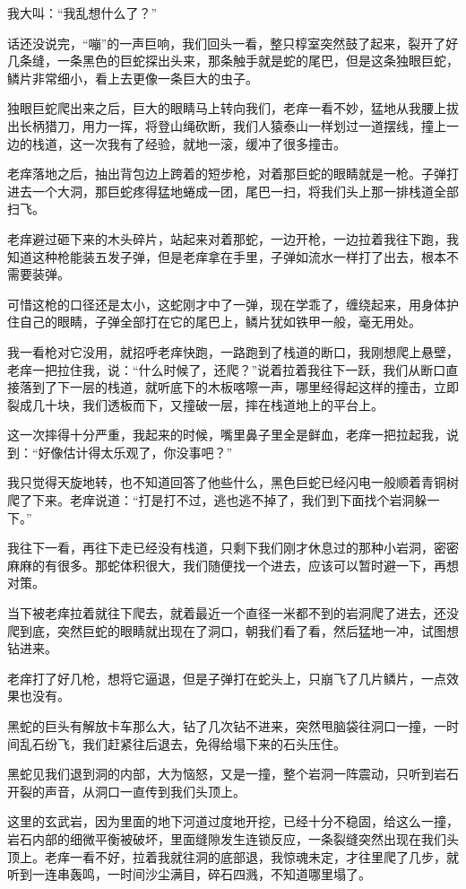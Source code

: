 我大叫：“我乱想什么了？”

话还没说完，“嘣”的一声巨响，我们回头一看，整只椁室突然鼓了起来，裂开了好几条缝，一条黑色的巨蛇探出头来，那条触手就是蛇的尾巴，但是这条独眼巨蛇，鳞片非常细小，看上去更像一条巨大的虫子。

独眼巨蛇爬出来之后，巨大的眼睛马上转向我们，老痒一看不妙，猛地从我腰上拔出长柄猎刀，用力一挥，将登山绳砍断，我们人猿泰山一样划过一道摆线，撞上一边的栈道，这一次我有了经验，就地一滚，缓冲了很多撞击。

老痒落地之后，抽出背包边上跨着的短步枪，对着那巨蛇的眼睛就是一枪。子弹打进去一个大洞，那巨蛇疼得猛地蜷成一团，尾巴一扫，将我们头上那一排栈道全部扫飞。

老痒避过砸下来的木头碎片，站起来对着那蛇，一边开枪，一边拉着我往下跑，我知道这种枪能装五发子弹，但是老痒拿在手里，子弹如流水一样打了出去，根本不需要装弹。

可惜这枪的口径还是太小，这蛇刚才中了一弹，现在学乖了，缠绕起来，用身体护住自己的眼睛，子弹全部打在它的尾巴上，鳞片犹如铁甲一般，毫无用处。

我一看枪对它没用，就招呼老痒快跑，一路跑到了栈道的断口，我刚想爬上悬壁，老痒一把拉住我，说：“什么时候了，还爬？”说着拉着我往下一跃，我们从断口直接落到了下一层的栈道，就听底下的木板喀嚓一声，哪里经得起这样的撞击，立即裂成几十块，我们透板而下，又撞破一层，摔在栈道地上的平台上。

这一次摔得十分严重，我起来的时候，嘴里鼻子里全是鲜血，老痒一把拉起我，说到：“好像估计得太乐观了，你没事吧？”

我只觉得天旋地转，也不知道回答了他些什么，黑色巨蛇已经闪电一般顺着青铜树爬了下来。老痒说道：“打是打不过，逃也逃不掉了，我们到下面找个岩洞躲一下。”

我往下一看，再往下走已经没有栈道，只剩下我们刚才休息过的那种小岩洞，密密麻麻的有很多。那蛇体积很大，我们随便找一个进去，应该可以暂时避一下，再想对策。

当下被老痒拉着就往下爬去，就着最近一个直径一米都不到的岩洞爬了进去，还没爬到底，突然巨蛇的眼睛就出现在了洞口，朝我们看了看，然后猛地一冲，试图想钻进来。

老痒打了好几枪，想将它逼退，但是子弹打在蛇头上，只崩飞了几片鳞片，一点效果也没有。

黑蛇的巨头有解放卡车那么大，钻了几次钻不进来，突然甩脑袋往洞口一撞，一时间乱石纷飞，我们赶紧往后退去，免得给塌下来的石头压住。

黑蛇见我们退到洞的内部，大为恼怒，又是一撞，整个岩洞一阵震动，只听到岩石开裂的声音，从洞口一直传到我们头顶上。

这里的玄武岩，因为里面的地下河道过度地开挖，已经十分不稳固，给这么一撞，岩石内部的细微平衡被破坏，里面缝隙发生连锁反应，一条裂缝突然出现在我们头顶上。老痒一看不好，拉着我就往洞的底部退，我惊魂未定，才往里爬了几步，就听到一连串轰鸣，一时间沙尘满目，碎石四溅，不知道哪里塌了。

